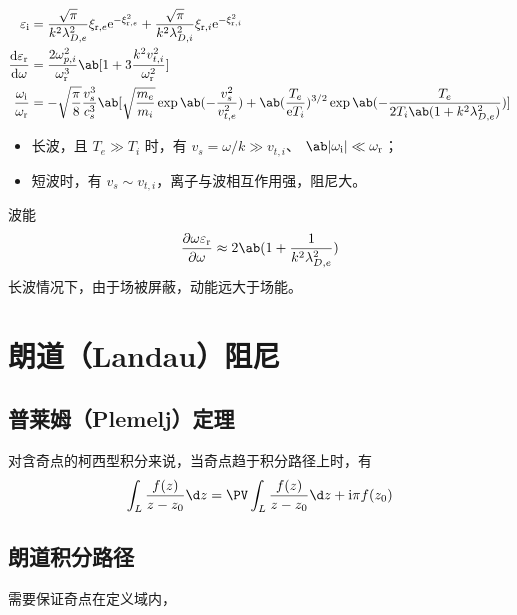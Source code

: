\begin{subequations}\begin{align}
\varepsilon_\im &=
\frac{\sqrt\pi}{k^2 \lambda_{D,e}^2}
\xi_{\re,e} \eu^{- \xi_{\re,e}^2}
+ \frac{\sqrt\pi}{k^2 \lambda_{D,i}^2}
\xi_{\re,i} \eu^{- \xi_{\re,i}^2} \\
\odv{\varepsilon_\re}{\omega} &=
\frac{2 \omega_{p,i}^2}{\omega_\re^3}
\ab[1 + 3 \frac{k^2 v_{t,i}^2}{\omega_\re^2}] \\
\frac{\omega_\im}{\omega_\re} &=
- \sqrt\frac\pi8 \frac{v_s^3}{c_s^3} \ab[
    \sqrt\frac{m_e}{m_i} \exp\ab(- \frac{v_s^2}{v_{t,e}^2})
    + \ab(\frac{T_e}{\eu T_i})^{3/2}
    \exp\ab(- \frac{T_e}{2 T_i \ab(1 + k^2 \lambda_{D,e}^2)})
]
\end{align}\end{subequations}

\begin{itemize}
    \item 长波，且 $T_e \gg T_i$ 时，有 $v_s = \omega / k \gg v_{t,i}$、
    $\ab|\omega_\im| \ll \omega_\re$；
    \item 短波时，有 $v_s \sim v_{t,i}$，离子与波相互作用强，阻尼大。
\end{itemize}

波能
\begin{equation}
\pdv{\omega \varepsilon_\re}{\omega}
\approx 2 \ab(1 + \frac{1}{k^2 \lambda_{D,e}^2})
\end{equation}
长波情况下，由于场被屏蔽，动能远大于场能。

\section{朗道（Landau）阻尼}

\subsection{普莱姆（Plemelj）定理}

对含奇点的柯西型积分来说，当奇点趋于积分路径上时，有
\begin{equation}
\int_L \frac{f(z)}{z - z_0} \d z
= \PV\int_L \frac{f(z)}{z - z_0} \d z + \im\pi f(z_0)
\end{equation}

\subsection{朗道积分路径}

需要保证奇点在定义域内，


